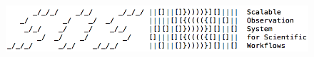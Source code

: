 %
\begin{figure}[h]
\centering
\includegraphics[width=\columnwidth]{images/sosflow_masthead.png}
\label{fig_masthead}
\end{figure}
%
